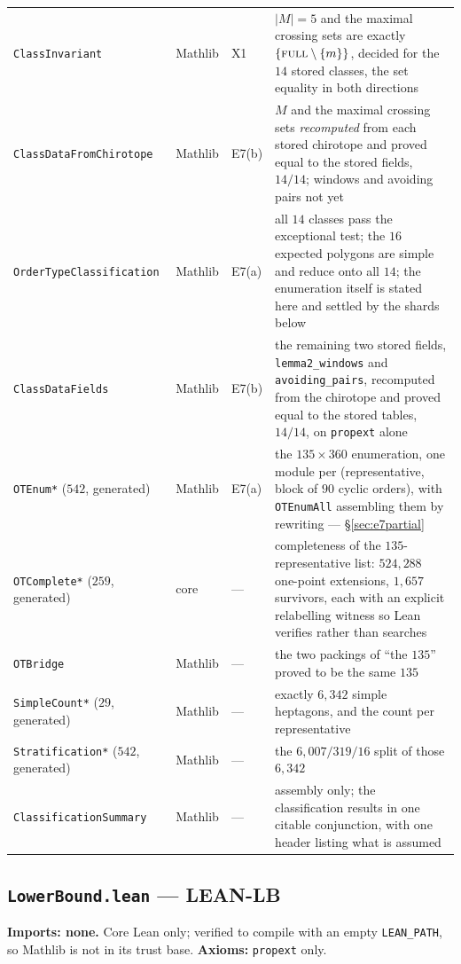 \documentclass[11pt,a4paper]{article}
\theoremstyle{plain}
\theoremstyle{definition}
\theoremstyle{remark}
\begin{document}
{\begin{longtable}{@{}>{\raggedright\arraybackslash}p{3.3cm}>{\raggedright\arraybackslash}p{1.5cm}>{\raggedright\arraybackslash}p{1.6cm}>{\raggedright\arraybackslash}p{7.4cm}@{}}
\texttt{ClassInvariant} & Mathlib & \textsf{X1} & $|M|=5$ and the maximal crossing sets are exactly $\{\textsc{full}\setminus\{m\}\}$, decided for the $14$ stored classes, the set equality in both directions \\
\texttt{ClassDataFromChirotope} & Mathlib & \textsf{E7}(b) & $M$ and the maximal crossing sets \emph{recomputed} from each stored chirotope and proved equal to the stored fields, $14/14$; windows and avoiding pairs not yet \\
\texttt{OrderTypeClassification} & Mathlib & \textsf{E7}(a) & all $14$ classes pass the exceptional test; the $16$ expected polygons are simple and reduce onto all $14$; the enumeration itself is stated here and settled by the shards below \\
\texttt{ClassDataFields} & Mathlib & \textsf{E7}(b) & the remaining two stored fields, \texttt{lemma2\_windows} and \texttt{avoiding\_pairs}, recomputed from the chirotope and proved equal to the stored tables, $14/14$, on \texttt{propext} alone \\
\texttt{OTEnum*} ($542$, generated) & Mathlib & \textsf{E7}(a) & the $135\times360$ enumeration, one module per (representative, block of $90$ cyclic orders), with \texttt{OTEnumAll} assembling them by rewriting --- \S\ref{sec:e7partial} \\
\texttt{OTComplete*} ($259$, generated) & core & --- & completeness of the $135$-representative list: $524{,}288$ one-point extensions, $1{,}657$ survivors, each with an explicit relabelling witness so Lean verifies rather than searches \\
\texttt{OTBridge} & Mathlib & --- & the two packings of ``the $135$'' proved to be the same $135$ \\
\texttt{SimpleCount*} ($29$, generated) & Mathlib & --- & exactly $6{,}342$ simple heptagons, and the count per representative \\
\texttt{Stratification*} ($542$, generated) & Mathlib & --- & the $6{,}007/319/16$ split of those $6{,}342$ \\
\texttt{ClassificationSummary} & Mathlib & --- & assembly only; the classification results in one citable conjunction, with one header listing what is assumed \\
\end{longtable}
}

\subsection*{\texttt{LowerBound.lean} --- \textsf{LEAN-LB}}
\textbf{Imports: none.} Core Lean only; verified to compile with an empty
\texttt{LEAN\_PATH}, so Mathlib is not in its trust base.
\textbf{Axioms:} \texttt{propext} only.
\end{document}
